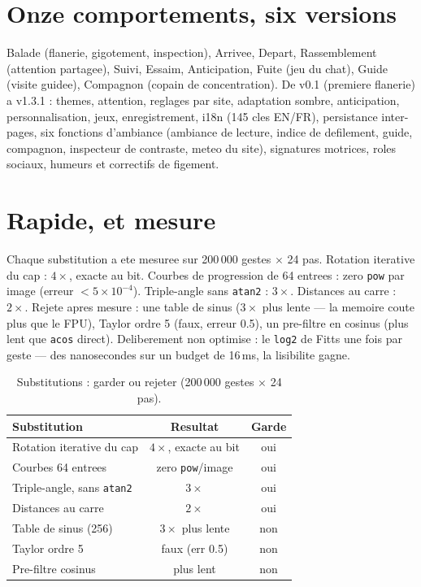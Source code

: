 \documentclass[10pt,conference]{IEEEtran}
\begin{document}
\section{Onze comportements, six versions}
Balade (flanerie, gigotement, inspection), Arrivee, Depart, Rassemblement
(attention partagee), Suivi, Essaim, Anticipation, Fuite (jeu du chat), Guide
(visite guidee), Compagnon (copain de concentration). De v0.1 (premiere
flanerie) a v1.3.1 : themes, attention, reglages par site, adaptation sombre,
anticipation, personnalisation, jeux, enregistrement, i18n (145 cles EN/FR),
persistance inter-pages, six fonctions d'ambiance (ambiance de lecture, indice
de defilement, guide, compagnon, inspecteur de contraste, meteo du site),
signatures motrices, roles sociaux, humeurs et correctifs de figement.

\section{Rapide, et mesure}
Chaque substitution a ete mesuree sur 200\,000 gestes $\times$ 24 pas.
Rotation iterative du cap : $4\times$, exacte au bit. Courbes de progression
de 64 entrees : zero \texttt{pow} par image (erreur $<5\times10^{-4}$).
Triple-angle sans \texttt{atan2} : $3\times$. Distances au carre : $2\times$.
Rejete apres mesure : une table de sinus ($3\times$ plus lente --- la memoire
coute plus que le FPU), Taylor ordre 5 (faux, erreur 0.5), un pre-filtre en
cosinus (plus lent que \texttt{acos} direct). Deliberement non optimise : le
\texttt{log2} de Fitts une fois par geste --- des nanosecondes sur un budget
de 16\,ms, la lisibilite gagne.

\begin{table}[h]
\centering
\caption{Substitutions : garder ou rejeter (200\,000 gestes $\times$ 24 pas).}
\begin{tabular}{@{}lcc@{}}
\toprule
Substitution & Resultat & Garde \\
\midrule
Rotation iterative du cap & $4\times$, exacte au bit & oui \\
Courbes 64 entrees & zero \texttt{pow}/image & oui \\
Triple-angle, sans \texttt{atan2} & $3\times$ & oui \\
Distances au carre & $2\times$ & oui \\
Table de sinus (256) & $3\times$ plus lente & non \\
Taylor ordre 5 & faux (err 0.5) & non \\
Pre-filtre cosinus & plus lent & non \\
\bottomrule
\end{tabular}
\end{table}
\end{document}
